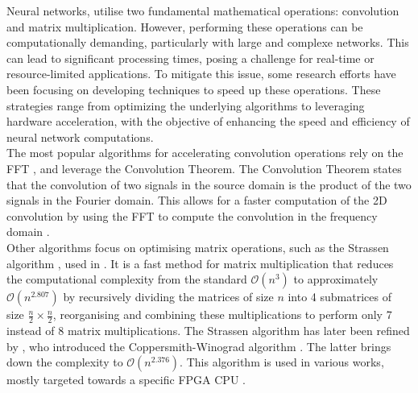 Neural networks, utilise two fundamental mathematical operations: convolution
and matrix multiplication. However, performing these operations can be
computationally demanding, particularly with large and complexe networks. This
can lead to significant processing times, posing a challenge for real-time or
resource-limited applications. To mitigate this issue, some research efforts have been
focusing on developing techniques to speed up these operations. These strategies
range from optimizing the underlying algorithms to leveraging hardware
acceleration, with the objective of enhancing the speed and efficiency of neural
network computations.\\


The most popular algorithms for accelerating convolution operations rely on the
\ac{FFT}
\cite{DBLP:conf/nips/ChiJM20,DBLP:journals/npl/LinY19,DBLP:conf/pkdd/PrattWCZ17},
and leverage the Convolution Theorem. The Convolution Theorem states that the
convolution of two signals in the source domain is the product of the two
signals in the Fourier domain. This allows for a faster computation of the 2D
convolution by using the \ac{FFT} to compute the convolution in the frequency
domain \cite{oppenheim1997signals}.\\


Other algorithms focus on optimising matrix operations, such as the Strassen
algorithm \cite{strassen1969gaussian}, used in \cite{DBLP:conf/icann/CongX14}.
It is a fast method for matrix multiplication that reduces the computational
complexity from the standard $\mathcal{O}(n^{3})$ to approximately
$\mathcal{O}(n^{2.807})$ by recursively dividing the matrices of size $n$ into 4
submatrices of size $\frac{n}{2} \times \frac{n}{2}$, reorganising and combining
these multiplications to perform only 7 instead of 8 matrix multiplications. The
Strassen algorithm has later been refined by \citeauthor{coppersmith1987matrix},
who introduced the Coppersmith-Winograd algorithm \cite{coppersmith1987matrix}.
The latter brings down the complexity to $\mathcal{O}(n^{2.376})$. This
algorithm is used in various works, mostly targeted towards a specific \ac{FPGA}
\ac{CPU} \cite{liu2018efficient,lu2018spwa,wang2020winonn}.\\


